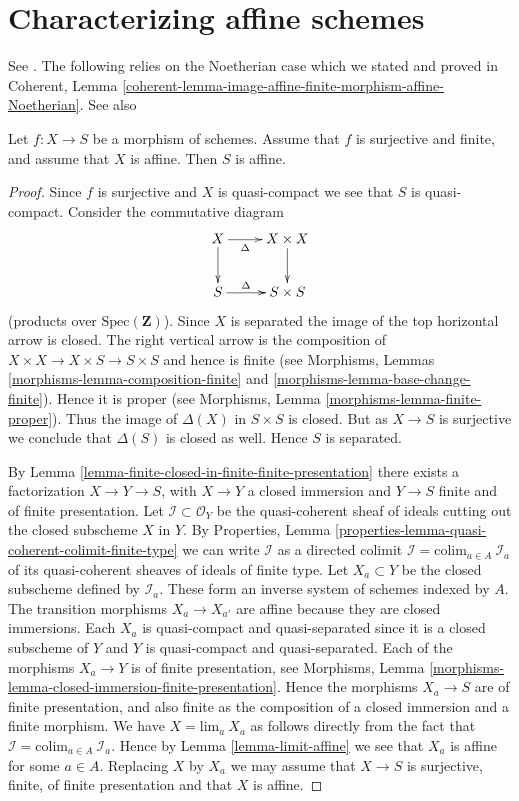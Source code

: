 \section{Characterizing affine schemes}
\label{section-affine}

\noindent
See \cite[A.2]{Conrad-Nagata}. The following relies on the Noetherian
case which we stated and proved in Coherent,
Lemma \ref{coherent-lemma-image-affine-finite-morphism-affine-Noetherian}.
See also \cite[II 6.7.1]{EGA}

\begin{lemma}
\label{lemma-affine}
Let $f : X \to S$ be a morphism of schemes.
Assume that $f$ is surjective and finite, and assume that $X$ is affine.
Then $S$ is affine.
\end{lemma}

\begin{proof}
Since $f$ is surjective and $X$ is quasi-compact we see that $S$ is
quasi-compact. Consider the commutative diagram
$$
\xymatrix{
X \ar[d] \ar[r]_-{\Delta} & X \times X \ar[d] \\
S  \ar[r]^-{\Delta} & S \times S
}
$$
(products over $\text{Spec}(\mathbf{Z})$).
Since $X$ is separated the image of the top horizontal arrow
is closed. The right vertical arrow is the composition of
$X\times X \to X \times S \to S \times S$ and hence is finite
(see Morphisms, Lemmas \ref{morphisms-lemma-composition-finite} and
\ref{morphisms-lemma-base-change-finite}). Hence it is proper (see
Morphisms, Lemma \ref{morphisms-lemma-finite-proper}). Thus the image
of $\Delta(X)$ in $S \times S$ is closed. But as $X \to S$ is surjective
we conclude that $\Delta(S)$ is closed as well. Hence $S$ is separated.

\medskip\noindent
By Lemma \ref{lemma-finite-closed-in-finite-finite-presentation}
there exists a factorization $X \to Y \to S$, with $X \to Y$ a
closed immersion and $Y \to S$ finite and of finite presentation.
Let $\mathcal{I} \subset \mathcal{O}_Y$ be the quasi-coherent sheaf of
ideals cutting out the closed subscheme $X$ in $Y$.
By
Properties, Lemma \ref{properties-lemma-quasi-coherent-colimit-finite-type}
we can write $\mathcal{I}$ as a directed colimit
$\mathcal{I} = \text{colim}_{a \in A}\ \mathcal{I}_a$ of its
quasi-coherent sheaves of ideals of finite type.
Let $X_a \subset Y$ be the closed subscheme defined by $\mathcal{I}_a$.
These form an inverse system of schemes indexed by $A$.
The transition morphisms $X_a \to X_{a'}$ are affine because
they are closed immersions. Each $X_a$ is quasi-compact and quasi-separated
since it is a closed subscheme of $Y$ and $Y$ is quasi-compact and
quasi-separated.
Each of the morphisms $X_a \to Y$ is of finite presentation, see
Morphisms, Lemma \ref{morphisms-lemma-closed-immersion-finite-presentation}.
Hence the morphisms $X_a \to S$ are of finite presentation, and
also finite as the composition of a closed immersion and a finite morphism.
We have $X = \text{lim}_a\ X_a$ as follows directly from the
fact that $\mathcal{I} = \text{colim}_{a \in A}\ \mathcal{I}_a$.
Hence by Lemma \ref{lemma-limit-affine} we see that $X_a$ is affine for some
$a \in A$. Replacing $X$ by $X_a$ we may assume that $X \to S$ is surjective,
finite, of finite presentation and that $X$ is affine.


\end{proof}
